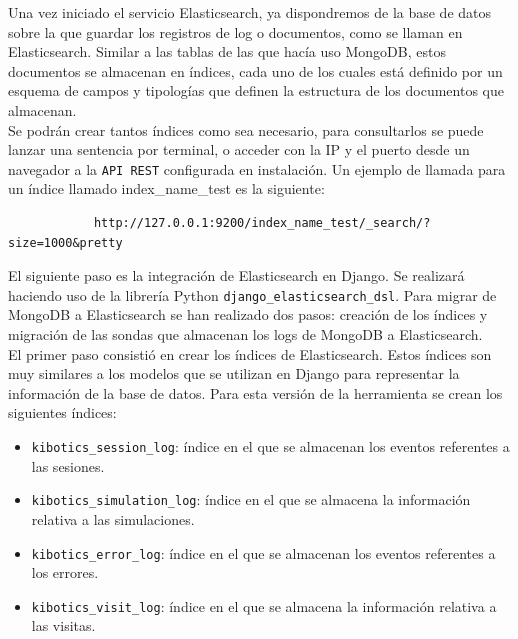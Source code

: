 \documentclass[a4paper, 12pt]{book}
\begin{document}
		Una vez iniciado el servicio Elasticsearch, ya dispondremos de la base de datos sobre la que guardar los registros de log o documentos, como se llaman en Elasticsearch. Similar a las tablas de las que hacía uso MongoDB, estos documentos se almacenan en índices, cada uno de los cuales está definido por un esquema de campos y tipologías que definen la estructura de los documentos que almacenan.\\
		
		Se podrán crear tantos índices como sea necesario, para consultarlos se puede lanzar una sentencia por terminal, o acceder con la IP y el puerto desde un navegador a la \texttt{API REST} configurada en instalación. Un ejemplo de llamada para un índice llamado index\_name\_test es la siguiente:
		
		{\footnotesize
		\begin{verbatim}
			http://127.0.0.1:9200/index_name_test/_search/?size=1000&pretty
		\end{verbatim}
		}
		
		El siguiente paso es la integración de Elasticsearch en Django. Se realizará haciendo uso de la librería Python \texttt{django\_elasticsearch\_dsl}. Para migrar de MongoDB a Elasticsearch se han realizado dos pasos: creación de los índices y migración de las sondas que almacenan los logs de MongoDB a Elasticsearch.\\
		
		
		El primer paso consistió en crear los índices de Elasticsearch. Estos índices son muy similares a los modelos que se utilizan en Django para representar la información de la base de datos. Para esta versión de la herramienta se crean los siguientes índices: 				
		
		\begin{itemize}
			\item \texttt{kibotics\_session\_log}: índice en el que se almacenan los eventos referentes a las sesiones.
			
			\item \texttt{kibotics\_simulation\_log}: índice en el que se almacena la información relativa a las simulaciones.
			
			\item \texttt{kibotics\_error\_log}: índice en el que se almacenan los eventos referentes a los errores.
			
			\item \texttt{kibotics\_visit\_log}: índice en el que se almacena la información relativa a las visitas.
		\end{itemize}				
		
\end{document}
